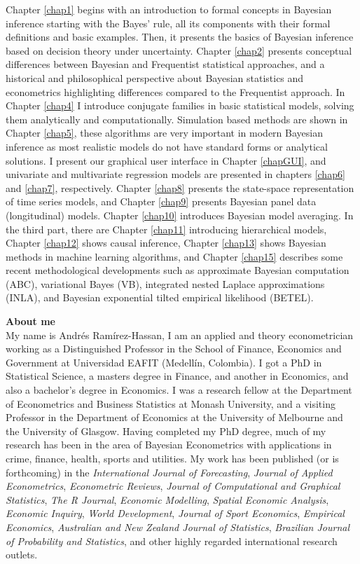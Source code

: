 Chapter \ref{chap1} begins with an introduction to formal concepts in Bayesian inference starting with the Bayes’ rule, all its components with their formal definitions and basic examples. Then, it presents the basics of Bayesian inference based on decision theory under uncertainty. Chapter \ref{chap2} presents conceptual differences between Bayesian and Frequentist statistical approaches, and a historical and philosophical perspective about Bayesian statistics and econometrics highlighting differences compared to the Frequentist approach. In Chapter \ref{chap4} I introduce conjugate families in basic statistical models, solving them analytically and computationally. Simulation based methods are shown in Chapter \ref{chap5}, these algorithms are very important in modern Bayesian inference as most realistic models do not have standard forms or analytical solutions. I present our graphical user interface in Chapter \ref{chapGUI}, and univariate and multivariate regression models are presented in chapters \ref{chap6} and \ref{chap7}, respectively. Chapter \ref{chap8} presents the state-space representation of time series models, and Chapter \ref{chap9} presents Bayesian panel data (longitudinal) models. Chapter \ref{chap10} introduces Bayesian model averaging. In the third part, there are Chapter \ref{chap11} introducing hierarchical models, Chapter \ref{chap12} shows causal inference, Chapter \ref{chap13} shows Bayesian methods in machine learning algorithms, and Chapter \ref{chap15} describes some recent methodological developments such as approximate Bayesian computation (ABC), variational Bayes (VB), integrated nested Laplace approximations (INLA), and Bayesian exponential tilted empirical likelihood (BETEL).

\textbf{About me}\\
My name is Andrés Ramírez-Hassan, I am an applied and theory econometrician working as a Distinguished Professor in the School of Finance, Economics and Government at Universidad EAFIT (Medellín, Colombia). I got a PhD in Statistical Science, a masters degree in Finance, and another in Economics, and also a bachelor’s degree in Economics. I was a research fellow at the Department of Econometrics and Business Statistics at Monash University, and a visiting Professor in the Department of Economics at the University of Melbourne and the University of Glasgow. Having completed my PhD degree, much of my research has been in the area of Bayesian Econometrics with applications in crime, finance, health, sports and utilities. My work has been published  (or is forthcoming) in the \textit{International Journal of Forecasting}, \textit{Journal of Applied Econometrics}, \textit{Econometric Reviews}, \textit{Journal of Computational and Graphical Statistics}, \textit{The R Journal}, \textit{Economic Modelling}, \textit{Spatial Economic Analysis}, \textit{Economic Inquiry}, \textit{World Development}, \textit{Journal of Sport Economics}, \textit{Empirical Economics}, \textit{Australian and New Zealand Journal of Statistics}, \textit{Brazilian Journal of Probability and Statistics}, and other highly regarded international research outlets.

